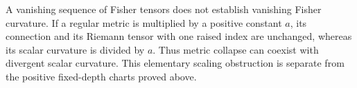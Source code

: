 A vanishing sequence of Fisher tensors does not establish vanishing Fisher
curvature. If a regular metric is multiplied by a positive constant
\(a\), its connection and its Riemann tensor with one raised index are
unchanged, whereas its scalar curvature is divided by \(a\). Thus metric
collapse can coexist with divergent scalar curvature. This elementary
scaling obstruction is separate from the positive fixed-depth charts
proved above. 